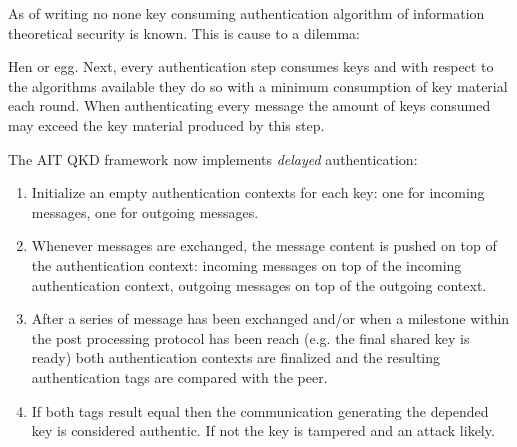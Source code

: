\medskip

As of writing no none key consuming authentication algorithm of information theoretical security is known. This is cause to a dilemma: 

\vspace{1cm}

\begin{center}
\begin{minipage}{10cm}
\end{minipage}    
\end{center}

\vspace{1cm}

Hen or egg. Next, every authentication step consumes keys and with respect to the algorithms available they do so with a minimum consumption of key material each round. When authenticating every message the amount of keys consumed may exceed the key material produced by this step.

\medskip

\clearpage

The AIT QKD framework now implements \emph{delayed} authentication: 

\begin{enumerate}

\item Initialize an empty authentication contexts for each key: one for incoming messages, one for outgoing messages.

\item Whenever messages are exchanged, the message content is pushed on top of the authentication context: incoming messages on top of the incoming authentication context, outgoing messages on top of the outgoing context.

\item After a series of message has been exchanged and/or when a milestone within the post processing protocol has been reach (e.g. the final shared key is ready) both authentication contexts are finalized and the resulting authentication tags are compared with the peer.

\item If both tags result equal then the communication generating the depended key is considered authentic. If not the key is tampered and an attack likely.

\end{enumerate}

